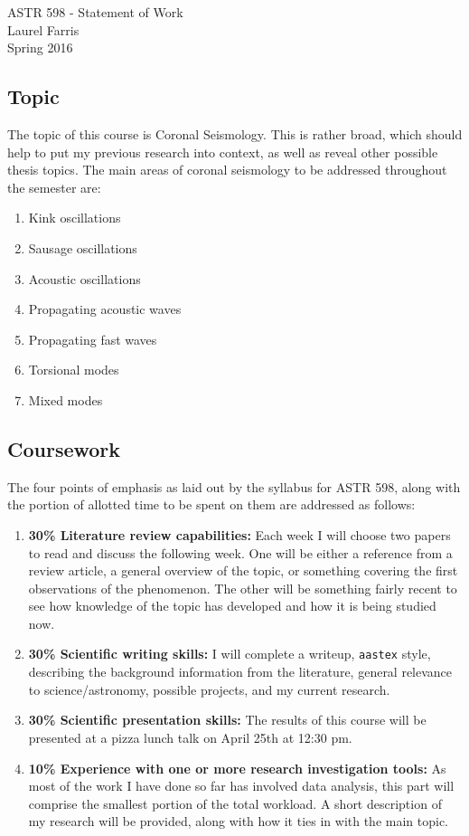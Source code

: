 \documentclass[12pt]{article}
\begin{document}
\begin{center}\Large
    \Large ASTR 598 - Statement of Work\\
    \large Laurel Farris\\
    \normalsize Spring 2016
\end{center}

\subsection*{Topic}
The topic of this course is Coronal Seismology. This is rather
broad, which should help
to put my previous research into context, as well as reveal other
possible thesis topics. The
main areas of coronal seismology to be addressed throughout the
semester are:
\begin{enumerate}
    \item Kink oscillations
    \item Sausage oscillations
    \item Acoustic oscillations
    \item Propagating acoustic waves
    \item Propagating fast waves
    \item Torsional modes
    \item Mixed modes
\end{enumerate}

\subsection*{Coursework}
The four points of emphasis as laid out by the syllabus for ASTR 598,
along with the portion
of allotted time to be spent on them are addressed as follows:
\begin{enumerate}
    \item \textbf{30\% Literature review capabilities:}
        Each week I will choose two papers to read and discuss the following
        week. One will be either a reference from a review article,
        a general overview of the topic, or something covering the first
        observations of the phenomenon. The other will be something fairly
        recent to see how knowledge of the topic has developed and how it is
        being studied now.
    \item \textbf{30\% Scientific writing skills:}
        I will complete a writeup, \texttt{aastex} style, describing the background
        information from the literature, general relevance to
        science/astronomy, possible projects,
        and my current research.
    \item \textbf{30\% Scientific presentation skills:}
        The results of this course will be presented at a pizza lunch
        talk on April 25th at 12:30 pm.
    \item \textbf{10\% Experience with one or more research
        investigation tools:}
        As most of the work I have done so far has involved data
        analysis, this part will comprise the smallest portion of the
        total workload. A short description of my research will be provided,
        along with how it ties in with the main topic.
\end{enumerate}
\end{document}

